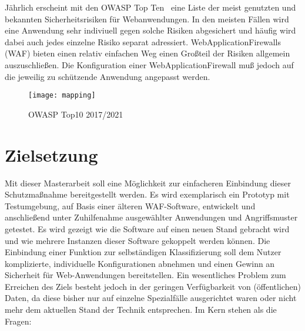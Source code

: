 Jährlich erscheint mit den OWASP Top Ten~\cite{owasp10}  eine Liste der meist genutzten und bekannten Sicherheitsrisiken für Webanwendungen. In den meisten Fällen wird eine Anwendung sehr indiviuell gegen solche Risiken abgesichert und häufig wird dabei auch jedes einzelne Risiko separat adressiert. WebApplicationFirewalls (WAF) bieten einen relativ einfachen Weg einen Großteil der Risiken allgemein auszuschließen. Die Konfiguration einer WebApplicationFirewall muß jedoch auf die jeweilig zu schützende Anwendung angepasst werden. 


\begin{figure}[bht]
  \begin{center}
    \texttt{[image: mapping]}
    \caption{OWASP Top10 2017/2021~\cite{owasp10}}
    \label{fig.topten}
  \end{center}
\end{figure}


\section{Zielsetzung}

Mit dieser Masterarbeit soll eine Möglichkeit zur einfacheren Einbindung dieser Schutzmaßnahme bereitgestellt werden. Es wird exemplarisch ein Prototyp mit Testumgebung, auf Basis einer älteren WAF-Software, entwickelt und anschließend unter Zuhilfenahme ausgewählter  Anwendungen und Angriffsmuster getestet.  Es wird gezeigt wie die Software auf einen neuen Stand gebracht wird und wie mehrere Instanzen dieser Software gekoppelt werden können. Die Einbindung einer Funktion zur selbständigen Klassifizierung soll dem Nutzer komplizierte, individuelle Konfigurationen abnehmen und einen Gewinn an Sicherheit für Web-Anwendungen bereitstellen. Ein wesentliches Problem zum Erreichen des Ziels besteht jedoch in der geringen Verfügbarkeit von (öffentlichen) Daten, da diese bisher nur auf einzelne Spezialfälle ausgerichtet waren oder nicht mehr dem aktuellen Stand der Technik entsprechen. Im Kern stehen als die Fragen:

